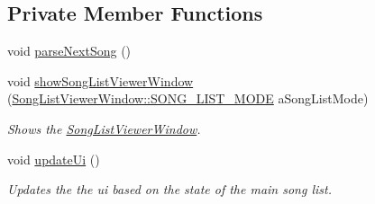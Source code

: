 \subsection*{Private Member Functions}
\begin{DoxyCompactItemize}
\item 
void \mbox{\hyperlink{class_startup_window_adb01cfe36f641352bc2c24a7df6faebd}{parse\+Next\+Song}} ()
\item 
void \mbox{\hyperlink{class_startup_window_adc6941b3def8ed33a8925bef6ad82449}{show\+Song\+List\+Viewer\+Window}} (\mbox{\hyperlink{class_song_list_viewer_window_a6f23a68c416173f6b571a2cc4990a927}{Song\+List\+Viewer\+Window\+::\+S\+O\+N\+G\+\_\+\+L\+I\+S\+T\+\_\+\+M\+O\+DE}} a\+Song\+List\+Mode)
\begin{DoxyCompactList}\small\item\em Shows the \mbox{\hyperlink{class_song_list_viewer_window}{Song\+List\+Viewer\+Window}}. \end{DoxyCompactList}\item 
void \mbox{\hyperlink{class_startup_window_a910d56e4b640d6b7b27a6de2ae18d736}{update\+Ui}} ()
\begin{DoxyCompactList}\small\item\em Updates the the ui based on the state of the main song list. \end{DoxyCompactList}\end{DoxyCompactItemize}
